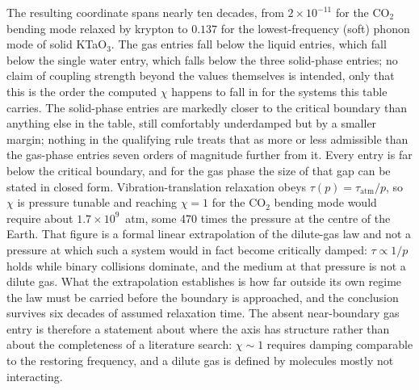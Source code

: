 \begin{table}[htbp]
\caption{The thirty systems that pass the qualifying rule directly, with no refusal. \(^{\dagger}\)\(\tau\) is the reported population lifetime for the gas and condensed-phase entries; for the eleven solid-phase entries, the source reports an amplitude-damping constant \(\gamma\) directly from a classical damped-harmonic-oscillator (Lorentz-oscillator) dielectric fit, and \(\tau\) shown here is the equivalent \(1/(2\pi c\gamma)\), carrying no new information. \(\chi = \gamma/2\omega_0\) is computed from it through the same engine used throughout this work. Tier records whether the source states the value in its abstract (\emph{abs.}) or its running text/table (Section~2.3); no entry here is a figure reading. The Rh(CO)\(_2\)acac system of Section~6 is deliberately absent: its lifetime is not source-tabulated.}
\label{tab:passtable}
\end{table}

The resulting coordinate spans nearly ten decades, from \(2\times10^{-11}\) for the CO\(_2\) bending mode relaxed by krypton to \(0.137\) for the lowest-frequency (soft) phonon mode of solid KTaO\(_3\). The gas entries fall below the liquid entries, which fall below the single water entry, which falls below the three solid-phase entries; no claim of coupling strength beyond the values themselves is intended, only that this is the order the computed \(\chi\) happens to fall in for the systems this table carries. The solid-phase entries are markedly closer to the critical boundary than anything else in the table, still comfortably underdamped but by a smaller margin; nothing in the qualifying rule treats that as more or less admissible than the gas-phase entries seven orders of magnitude further from it. Every entry is far below the critical boundary, and for the gas phase the size of that gap can be stated in closed form. Vibration-translation relaxation obeys \(\tau(p) = \tau_{\mathrm{atm}}/p\), so \(\chi\) is pressure tunable and reaching \(\chi = 1\) for the CO\(_2\) bending mode would require about \(1.7\times10^{9}\)~atm, some 470 times the pressure at the centre of the Earth. That figure is a formal linear extrapolation of the dilute-gas law and not a pressure at which such a system would in fact become critically damped: \(\tau \propto 1/p\) holds while binary collisions dominate, and the medium at that pressure is not a dilute gas. What the extrapolation establishes is how far outside its own regime the law must be carried before the boundary is approached, and the conclusion survives six decades of assumed relaxation time. The absent near-boundary gas entry is therefore a statement about where the axis has structure rather than about the completeness of a literature search: \(\chi \sim 1\) requires damping comparable to the restoring frequency, and a dilute gas is defined by molecules mostly not interacting.
